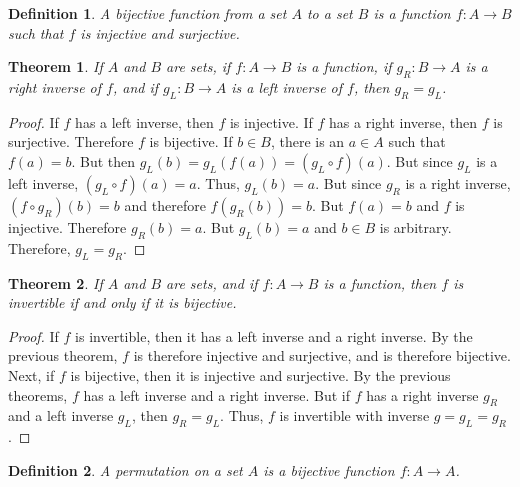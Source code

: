 \documentclass{article}
\theoremstyle{plain}
\newtheorem{theorem}{Theorem}[section]
\theoremstyle{normal}
\newtheorem{definition}{Definition}[section]
\begin{document}
        \begin{definition}
            A bijective function from a set $A$ to a set $B$ is a function
            $f:A\rightarrow{B}$ such that $f$ is injective and surjective.
        \end{definition}
        \begin{theorem}
            If $A$ and $B$ are sets, if $f:A\rightarrow{B}$ is a function,
            if $g_{R}:B\rightarrow{A}$ is a right inverse of $f$, and if
            $g_{L}:B\rightarrow{A}$ is a left inverse of $f$, then
            $g_{R}=g_{L}$.
        \end{theorem}
        \begin{proof}
            If $f$ has a left inverse, then $f$ is injective. If $f$ has a
            right inverse, then $f$ is surjective. Therefore $f$ is bijective.
            If $b\in{B}$, there is an $a\in{A}$ such that $f(a)=b$. But then
            $g_{L}(b)=g_{L}(f(a))=(g_{L}\circ{f})(a)$. But since
            $g_{L}$ is a left inverse, $(g_{L}\circ{f})(a)=a$. Thus,
            $g_{L}(b)=a$. But since $g_{R}$ is a right inverse,
            $(f\circ{g}_{R})(b)=b$ and therefore $f(g_{R}(b))=b$. But
            $f(a)=b$ and $f$ is injective. Therefore $g_{R}(b)=a$. But
            $g_{L}(b)=a$ and $b\in{B}$ is arbitrary. Therefore, $g_{L}=g_{R}$.
        \end{proof}
        \begin{theorem}
            If $A$ and $B$ are sets, and if $f:A\rightarrow{B}$ is a function,
            then $f$ is invertible if and only if it is bijective.
        \end{theorem}
        \begin{proof}
            If $f$ is invertible, then it has a left inverse and a right
            inverse. By the previous theorem, $f$ is therefore injective and
            surjective, and is therefore bijective. Next, if $f$ is bijective,
            then it is injective and surjective. By the previous theorems, $f$
            has a left inverse and a right inverse. But if $f$ has a right
            inverse $g_{R}$ and a left inverse $g_{L}$, then $g_{R}=g_{L}$.
            Thus, $f$ is invertible with inverse $g=g_{L}=g_{R}$.
        \end{proof}
        \begin{definition}
            A permutation on a set $A$ is a bijective function
            $f:A\rightarrow{A}$.
        \end{definition}
\end{document}
